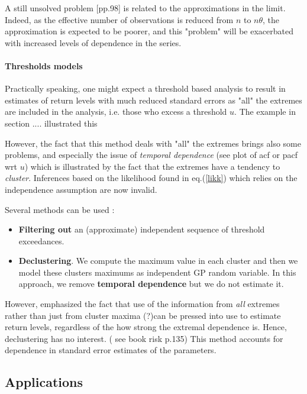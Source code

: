 \documentclass[11pt,a4paper,openany ]{book}
\begin{document}
A still unsolved problem \cite{coles_introduction_2001}[pp.98] is related to the 
approximations in the limit.
Indeed, as the effective number of observations is reduced from $n$ to $n\theta$, the approximation is expected to be poorer, and this "problem" will be exacerbated
with increased levels of dependence in the series.

\paragraph*{Thresholds models}
Practically speaking, one might expect a threshold based analysis to result in estimates of return levels with much reduced standard errors as "all" the extremes are included in the analysis, i.e. those who excess a threshold $u$. The example in section .... illustrated this

However, the fact that this method deals with "all" the extremes brings also some problems, 
and especially the issue of \textit{temporal dependence} (see plot of acf or pacf wrt $u$) 
which is illustrated by the fact that the extremes have a tendency to \emph{cluster}. 
Inferences based on the likelihood found in eq.(\ref{likk}) which relies on the 
independence assumption are now invalid.

Several methods can be used : 

\begin{itemize}
	\item \textbf{Filtering out} an (approximate) independent sequence of threshold exceedances.
	\item \textbf{Declustering}. We compute the maximum value in each cluster and then we model these clusters maximums as independent GP random variable. In this approach, we remove \textbf{temporal dependence} but we do not estimate it.
	
\end{itemize}


However, \cite{fawcett_estimating_2012} emphasized the fact that use of the information from \textit{all} extremes rather than just from cluster maxima (?)can be pressed into use to estimate return levels, regardless of the how strong the extremal dependence is. Hence, declustering has no interest. ( see book risk p.135)
This method accounts for dependence in standard error estimates of the parameters.


\subsection{Applications}
\end{document}
